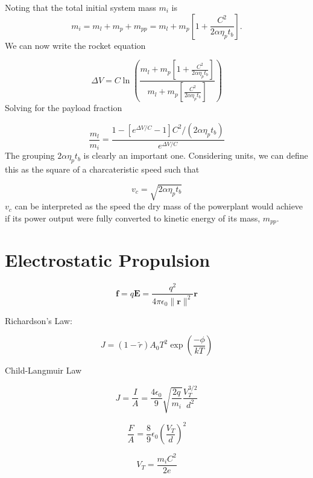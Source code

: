 \documentclass[twocolumn]{memoir} %
\begin{document}
Noting that the total initial system mass $m_i$ is
%
\begin{equation*}
    m_i = m_l + m_p + m_{pp} = m_l + m_p \left[1 + \frac{C^2}{2 \alpha \eta_p t_b}\right].
\end{equation*}
%
We can now write the rocket equation

\begin{equation*}
    \Delta V = C\ln{\left(\frac{ m_l + m_p \left[1 + \frac{C^2}{2 \alpha \eta_p t_b}\right]}
    { m_l + m_p \left[\frac{C^2}{2 \alpha \eta_p t_b}\right]}\right)}
\end{equation*}
%
Solving for the payload fraction

\begin{equation}
    \frac{m_l}{m_i} = \frac{1 - \left[e^{\Delta V / C} - 1\right]C^2/\left(2 \alpha \eta_p t_b\right)}{e^{\Delta V/C}}
\end{equation}
The grouping $2 \alpha \eta_p t_b$ is clearly an important one.  Considering units, we can define this as the square of a charcateristic speed such that

\begin{equation}
    v_c = \sqrt{2 \alpha \eta_p t_b}
\end{equation}
%
$v_c$ can be interpreted as the speed the dry mass of the powerplant would achieve if its power output were fully converted to kinetic energy of its mass, $m_{pp}$.

\section{Electrostatic Propulsion}

\begin{equation}
    \mathbf{f} = q\mathbf{E} = \frac{q^2}{4 \pi \epsilon_0 \| \mathbf{r}\|^2 }\mathbf{r}
\end{equation}

Richardson's Law:

\begin{equation}
    J = (1 - \tilde{r})A_0T^2 \exp{\left(\frac{-\phi}{kT}\right)}
\end{equation}

Child-Langmuir Law

\begin{equation}
    J = \frac{I}{A} = \frac{4 \epsilon_0}{9}\sqrt{\frac{2 q}{m_i}} \frac{V_T^{3/2}}{d^2}
\end{equation}

\begin{equation}
    \frac{F}{A} = \frac{8}{9}\epsilon_0 \left(\frac{V_T}{d}\right)^2
\end{equation}


\begin{equation}
    V_T = \frac{m_i C^2}{2 e}
\end{equation}



\end{document}
